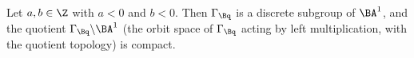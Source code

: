 Let $a,b\in\Z$ with $a<0$ and $b<0$. Then $\Gamma_{\Bq}$ is a discrete subgroup of $\BA^1$, and the quotient
$\Gamma_{\Bq}\backslash\BA^1$ (the orbit space of $\Gamma_{\Bq}$ acting by left multiplication, with the quotient topology) is compact.
